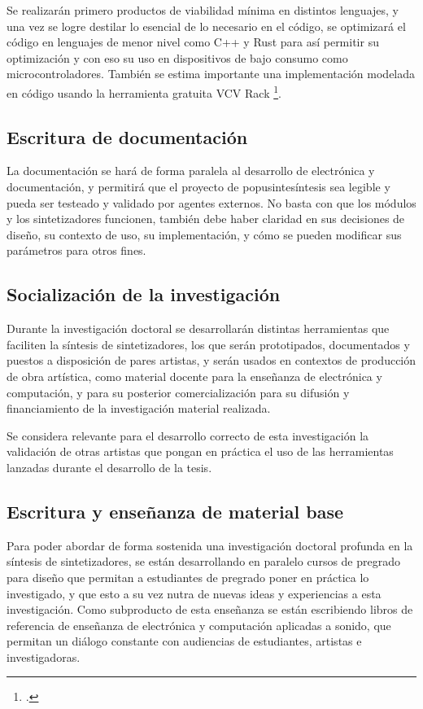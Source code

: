 \documentclass[../proyecto.tex]{subfiles}
\begin{document}
Se realizarán primero productos de viabilidad mínima en distintos lenguajes, y una vez se logre destilar lo esencial de lo necesario en el código, se optimizará el código en lenguajes de menor nivel como C++ y Rust para así permitir su optimización y con eso su uso en dispositivos de bajo consumo como microcontroladores. También se estima importante una implementación modelada en código usando la herramienta gratuita VCV Rack \footcite{gabrielli_developing_2020}.

\subsection{Escritura de documentación}

La documentación se hará de forma paralela al desarrollo de electrónica y documentación, y permitirá que el proyecto de popusintesíntesis sea legible y pueda ser testeado y validado por agentes externos. No basta con que los módulos y los sintetizadores funcionen, también debe haber claridad en sus decisiones de diseño, su contexto de uso, su implementación, y cómo se pueden modificar sus parámetros para otros fines.

\subsection{Socialización de la investigación}

Durante la investigación doctoral se desarrollarán distintas herramientas que faciliten la síntesis de sintetizadores, los que serán prototipados, documentados y puestos a disposición de pares artistas, y serán usados en contextos de producción de obra artística, como material docente para la enseñanza de electrónica y computación, y para su posterior comercialización para su difusión y financiamiento de la investigación material realizada.

Se considera relevante para el desarrollo correcto de esta investigación la validación de otras artistas que pongan en práctica el uso de las herramientas lanzadas durante el desarrollo de la tesis.

\subsection{Escritura y enseñanza de material base}

Para poder abordar de forma sostenida una investigación doctoral profunda en la síntesis de sintetizadores, se están desarrollando en paralelo cursos de pregrado para diseño que permitan a estudiantes de pregrado poner en práctica lo investigado, y que esto a su vez nutra de nuevas ideas y experiencias a esta investigación. Como subproducto de esta enseñanza se están escribiendo libros de referencia de enseñanza de electrónica y computación aplicadas a sonido, que permitan un diálogo constante con audiencias de estudiantes, artistas e investigadoras.
\end{document}
